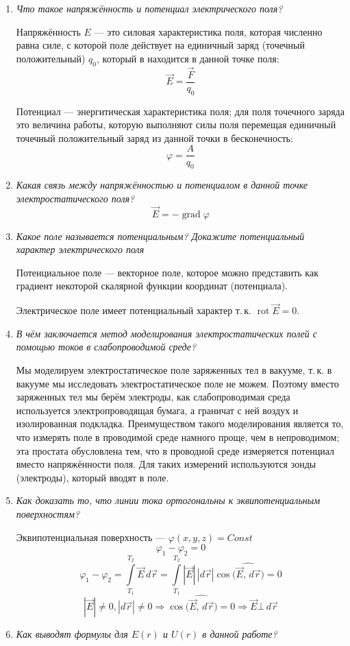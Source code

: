 \documentclass[a4paper,10pt]{article}
\begin{document}
\begin{enumerate}
\item \textit{Что такое напряжённость и потенциал электрического поля?}

Напряжённость $E$ --- это силовая характеристика поля, которая численно равна силе,
с которой поле действует на единичный заряд (точечный положительный) $q_0$, который в находится в данной точке поля:
$$\vec{E} = \frac{\vec{F}}{q_0}$$

Потенциал --- энергитическая характеристика поля; для поля точечного заряда это величина работы,
которую выполняют силы поля перемещая единичный точечный положительный заряд из данной точки в бесконечность:
$$\varphi = \frac{A}{q_0}$$
\item \textit{Какая связь между напряжённостью и потенциалом в данной точке электростатического поля?}
$$\vec{E} = -\mathop{grad} \varphi$$
\item \textit{Какое поле называется потенциальным? Докажите потенциальный характер электрического поля}

Потенциальное поле --- векторное поле, которое можно представить как градиент некоторой скалярной функции координат (потенциала).

Электрическое поле имеет потенциальный характер т.\,к. $\mathop{rot}\vec{E} = 0$.
\item \textit{В чём заключается метод моделирования электростатических полей с помощью токов в слабопроводимой среде?}

Мы моделируем электростатическое поле заряженных тел в вакууме, т.\,к. в вакууме мы исследовать электростатическое поле не можем.
Поэтому вместо заряженных тел мы берём электроды, как слабопроводимая среда используется электропроводящая бумага,
а граничат с ней воздух и изолированная подкладка.
Преимуществом такого моделирования является то, что измерять поле в проводимой среде намного проще, чем в непроводимом;
эта простата обусловлена тем, что в проводной среде измеряется потенциал вместо напряжённости поля.
Для таких измерений используются зонды (электроды), который вводят в поле.
\item \textit{Как доказать то, что линии тока ортогональны к эквипотенциальным поверхностям?}

Эквипотенциальная поверхность --- $\varphi\left(x, y, z\right) = Const$
$$\varphi_1 - \varphi_2 = 0$$
$$\varphi_1 - \varphi_2 = \int\limits_{T_1}^{T_2}\vec{E}\,d\vec{r} = \int\limits_{T_1}^{T_2}|\vec{E}|\,|d\vec{r}|
\cos\bigl(\widehat{\vec{E},\,d\vec{r}}\bigr) = 0$$
$$|\vec{E}| \not = 0, |d\vec{r}| \not = 0 \Rightarrow \cos\bigl(\widehat{\vec{E},\,d\vec{r}}\bigr) = 0
\Rightarrow \vec{E}\bot\,d\vec{r}$$
\item \textit{Как выводят формулы для $E\left(r\right)$ и $U\left(r\right)$ в данной работе?}


\end{enumerate}
\end{document}
